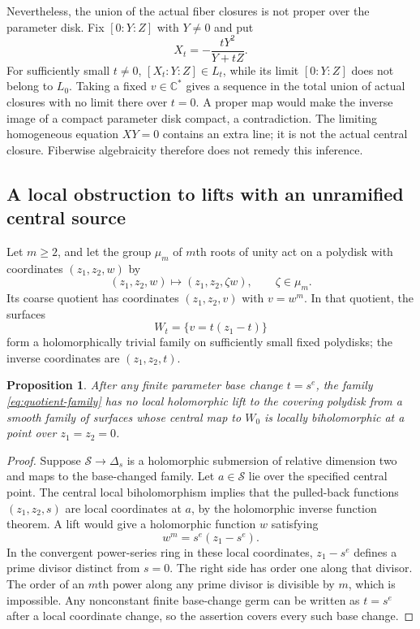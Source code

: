 \documentclass[11pt]{article}
\newcommand{\C}{\mathbb C}
\newtheorem{proposition}[theorem]{Proposition}
\theoremstyle{definition}
\theoremstyle{remark}
\begin{document}
Nevertheless, the union of the actual fiber closures is not proper over the parameter disk. Fix $[0:Y:Z]$ with $Y\ne0$ and put
\[
 X_t=-\frac{tY^2}{Y+tZ}.
\]
For sufficiently small $t\ne0$, $[X_t:Y:Z]\in L_t$, while its limit $[0:Y:Z]$ does not belong to $L_0$. Taking a fixed $v\in\C^*$ gives a sequence in the total union of actual closures with no limit there over $t=0$. A proper map would make the inverse image of a compact parameter disk compact, a contradiction. The limiting homogeneous equation $XY=0$ contains an extra line; it is not the actual central closure. Fiberwise algebraicity therefore does not remedy this inference.

\subsection{A local obstruction to lifts with an unramified central source}

Let $m\geq2$, and let the group $\mu_m$ of $m$th roots of unity act on a polydisk with coordinates $(z_1,z_2,w)$ by
\[
 (z_1,z_2,w)\longmapsto(z_1,z_2,\zeta w),\qquad\zeta\in\mu_m.
\]
Its coarse quotient has coordinates $(z_1,z_2,v)$ with $v=w^m$. In that quotient, the surfaces
\begin{equation}\label{eq:quotient-family}
 W_t=\{v=t(z_1-t)\}
\end{equation}
form a holomorphically trivial family on sufficiently small fixed polydisks; the inverse coordinates are $(z_1,z_2,t)$.

\begin{proposition}\label{prop:no-lift}
After any finite parameter base change $t=s^e$, the family \eqref{eq:quotient-family} has no local holomorphic lift to the covering polydisk from a smooth family of surfaces whose central map to $W_0$ is locally biholomorphic at a point over $z_1=z_2=0$.
\end{proposition}

\begin{proof}
Suppose $\mathcal S\to\Delta_s$ is a holomorphic submersion of relative dimension two and maps to the base-changed family. Let $a\in\mathcal S$ lie over the specified central point. The central local biholomorphism implies that the pulled-back functions $(z_1,z_2,s)$ are local coordinates at $a$, by the holomorphic inverse function theorem. A lift would give a holomorphic function $w$ satisfying
\[
 w^m=s^e(z_1-s^e).
\]
In the convergent power-series ring in these local coordinates, $z_1-s^e$ defines a prime divisor distinct from $s=0$. The right side has order one along that divisor. The order of an $m$th power along any prime divisor is divisible by $m$, which is impossible. Any nonconstant finite base-change germ can be written as $t=s^e$ after a local coordinate change, so the assertion covers every such base change.
\end{proof}
\end{document}
